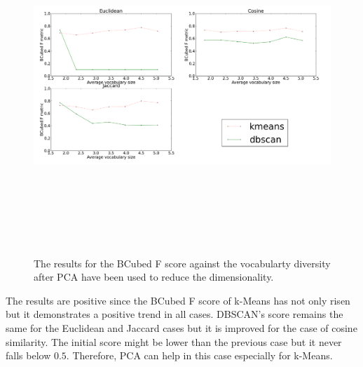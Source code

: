 \begin{figure}[htbp]
  \begin{center}
    \includegraphics[height=5in, width=6in]{vocabulary_pca}
    \caption{The results for the BCubed F score against the vocabularty diversity after PCA have been used to reduce the dimensionality.}
    \label{DifferentVocabularyPCAResults}
  \end{center}
\end{figure}
\noindent The results are positive since the BCubed F score of k-Means has not only risen but it demonstrates a positive trend in all cases. DBSCAN's score remains the same for the Euclidean and Jaccard cases but it is improved for the case of cosine similarity. The initial score might be lower than the previous case but it never falls below $0.5$. Therefore, PCA can help in this case especially for k-Means.


